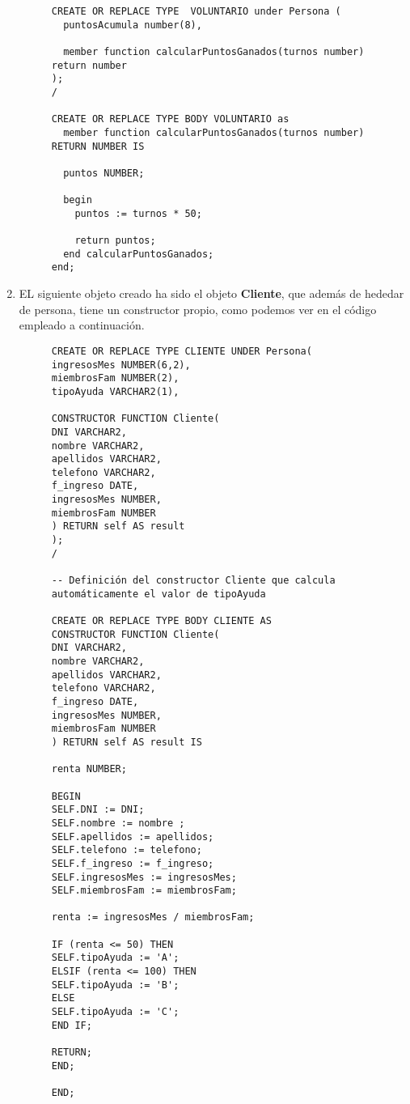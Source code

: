 \begin{enumerate}[label=\alph*)]
\begin{figure}[H]
\begin{tcolorbox}[sharp corners, colback=yellow!30, colframe=white!20]
\begin{verbatim}
CREATE OR REPLACE TYPE  VOLUNTARIO under Persona (
  puntosAcumula number(8),

  member function calcularPuntosGanados(turnos number) return number
);
/

CREATE OR REPLACE TYPE BODY VOLUNTARIO as
  member function calcularPuntosGanados(turnos number) RETURN NUMBER IS

  puntos NUMBER;

  begin
    puntos := turnos * 50;

    return puntos;
  end calcularPuntosGanados;
end;\end{verbatim}
        \end{tcolorbox}
    \end{figure}

    \item EL siguiente objeto creado ha sido el objeto \textbf{Cliente}, que además de hededar de persona, tiene un constructor propio, como podemos ver en el código empleado a continuación.

    \begin{figure}[H]
        \begin{tcolorbox}[sharp corners, colback=yellow!30, colframe=white!20]
            \tiny
            \begin{verbatim}
CREATE OR REPLACE TYPE CLIENTE UNDER Persona(
ingresosMes NUMBER(6,2),
miembrosFam NUMBER(2),
tipoAyuda VARCHAR2(1),

CONSTRUCTOR FUNCTION Cliente(
DNI VARCHAR2,
nombre VARCHAR2,
apellidos VARCHAR2,
telefono VARCHAR2,
f_ingreso DATE,
ingresosMes NUMBER,
miembrosFam NUMBER
) RETURN self AS result
);
/

-- Definición del constructor Cliente que calcula automáticamente el valor de tipoAyuda

CREATE OR REPLACE TYPE BODY CLIENTE AS
CONSTRUCTOR FUNCTION Cliente(
DNI VARCHAR2,
nombre VARCHAR2,
apellidos VARCHAR2,
telefono VARCHAR2,
f_ingreso DATE,
ingresosMes NUMBER,
miembrosFam NUMBER
) RETURN self AS result IS

renta NUMBER;

BEGIN
SELF.DNI := DNI;
SELF.nombre := nombre ;
SELF.apellidos := apellidos;
SELF.telefono := telefono;
SELF.f_ingreso := f_ingreso;
SELF.ingresosMes := ingresosMes;
SELF.miembrosFam := miembrosFam;

renta := ingresosMes / miembrosFam;

IF (renta <= 50) THEN
SELF.tipoAyuda := 'A';
ELSIF (renta <= 100) THEN
SELF.tipoAyuda := 'B';
ELSE
SELF.tipoAyuda := 'C';
END IF;

RETURN;
END;

END;
            \end{verbatim}
        \end{tcolorbox}
    \end{figure}
\end{enumerate}

